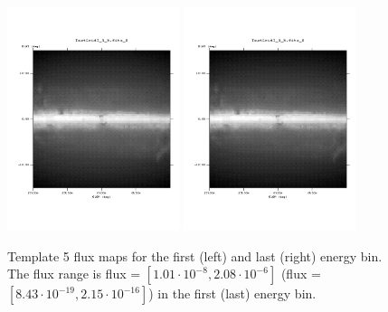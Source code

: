 \documentclass{article}
\begin{document}
\begin{figure}
\centering
\includegraphics[trim = 50 100 70 100, clip = true, width=0.45\textwidth]{figs/Template_maps/Template5_Ebin01}
\includegraphics[trim = 50 100 70 100, clip = true, width=0.45\textwidth]{figs/Template_maps/Template5_Ebin71}
\caption{Template 5 flux maps for the first (left) and last (right) energy bin. The flux range is flux = $[1.01 \cdot 10^{-8}, 2.08 \cdot 10^{-6}]$ (flux = $[8.43 \cdot 10^{-19}, 2.15 \cdot 10^{-16}]$) in the first (last) energy bin.}
\end{figure}
\end{document}
